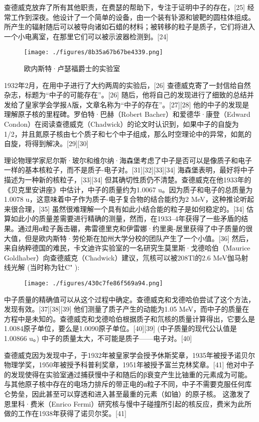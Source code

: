 查德威克放弃了所有其他职责，在费瑟的帮助下，专注于证明中子的存在，[25] 经常工作到深夜。他设计了一个简单的设备，由一个装有钋源和铍靶的圆柱体组成。所产生的辐射随后可以被导向诸如石蜡的材料；被转移的粒子是质子，它们将进入一个小电离室，在那里它们可以被示波器检测到。[24]
\begin{figure}[ht]
\centering
\texttt{[image: ./figures/8b35a67b67be4339.png]}
\caption{欧内斯特·卢瑟福爵士的实验室} \label{fig_CHFR_2}
\end{figure}
1932年2月，在用中子进行了大约两周的实验后，[26] 查德威克寄了一封信给自然杂志，标题为“中子的可能存在”。[26] 随后，他将自己的发现进行了细致的总结并发给了皇家学会学报A版，文章名称为“中子的存在”。[27][28] 他的中子的发现是理解原子核的里程碑。罗伯特·巴赫（Robert Bacher）和爱德华·康登（Edward Condon）在阅读查德威克（Chadwick）的论文时认识到，如果中子的自旋为1/2，并且氮原子核由七个质子和七个中子组成，那么时空理论中的异常，如氮的自旋，将得到解决。[29][30]

理论物理学家尼尔斯·玻尔和维尔纳·海森堡考虑了中子是否可以是像质子和电子一样的基本核粒子，而不是质子-电子对。[31][32][33][34] 海森堡表明，最好将中子描述为一种新的核粒子，[33][34] 但其确切性质仍不清楚。查德威克在他1933年的《贝克里安讲座》中估计，中子的质量约为1.0067 u。因为质子和电子的总质量为1.0078 u，这意味着中子作为质子-电子复合物的结合能约为2 MeV，这种推论听起来很合理，[35] 虽然很难理解一个具有如此小结合能的粒子是如何稳定的。[34] 估算如此小的质量差需要进行精确的测量，然而，在1933–4年获得了一些矛盾的结果。通过用α粒子轰击硼，弗雷德里克和伊雷娜·约里奥-居里获得了中子质量的很大值，但是欧内斯特·劳伦斯在加州大学分校的团队产生了一个小值。[36] 然后，来自纳粹德国的难民，卡文迪许实验室的一名研究生莫里斯·戈德哈伯（Maurice Goldhaber）向查德威克（Chadwick）建议，氘核可以被208Tl的2.6 MeV伽马射线光解 (当时称为钍C" ):
\begin{figure}[ht]
\centering
\texttt{[image: ./figures/430c7fe86f569a94.png]}
\caption \label{fig_CHFR_3}
\end{figure}
中子质量的精确值可以从这个过程中确定。查德威克和戈德哈伯尝试了这个方法，发现有效。[37][38][39] 他们测量了质子产生的动能为1.05 MeV，而中子的质量在方程中是未知的。查德威克和戈德哈伯根据质子和氘核的质量计算得出，它要么是1.0084原子单位，要么是1.0090原子单位。[40][39] (中子质量的现代公认值是1.00866 u。) 中子的质量太大，不可能是质子——电子对。[40]

查德威克因为发现中子，于1932年被皇家学会授予休斯奖章，1935年被授予诺贝尔物理学奖，1950年被授予科普利奖章，1951年被授予富兰克林奖章。[41] 他对中子的发现使得在实验室通过捕获慢中子和随后的β衰变产生比铀重的元素成为可能。与其他原子核中存在的电场力排斥的带正电的α粒子不同，中子不需要克服任何库仑势垒，因此甚至可以穿透和进入甚至最重的元素（如铀）的原子核。 这激发了恩里科·费米（Enrico Fermi）研究核与慢中子碰撞所引起的核反应，费米为此所做的工作在1938年获得了诺贝尔奖。[41]


